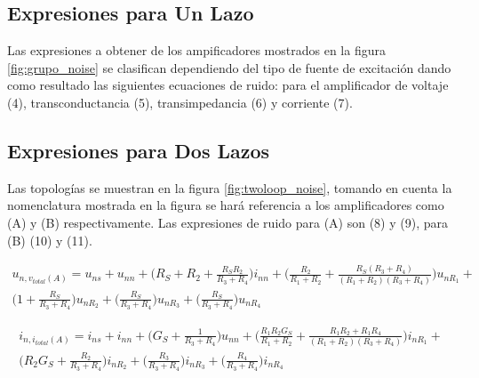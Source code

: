 \documentclass[10pt,twocolumn,twoside,letterpaper]{IEEEtran}
\begin{document}
{\subsection{{\bf Expresiones para Un Lazo}}
\label{sec:exp_1loop} Las expresiones a obtener de los ampificadores mostrados en la figura \ref{fig:grupo_noise} se clasifican dependiendo del tipo de fuente de excitaci\'on dando como resultado las siguientes ecuaciones de ruido: para el amplificador de voltaje (4), transconductancia (5), transimpedancia (6) y corriente (7).

\subsection{{\bf Expresiones para Dos Lazos}}
\label{sec:exp_2loop} Las topolog\'ias se muestran en la figura \ref{fig:twoloop_noise}, tomando en cuenta la nomenclatura mostrada en la figura se har\'a referencia a los amplificadores como (A) y (B) respectivamente. Las expresiones de ruido para (A) son (8) y (9), para (B) (10) y (11).

\begin{figure*}[!t]
\hrulefill
\begin{footnotesize}\begin{equation}
\label{Amplificador (A) excitado por Voltaje}
\begin{split}
u_{n,v_{total}(A)}=u_{ns}+u_{nn}+\biggl(R_S+R_2+\frac{R_SR_2}{R_3+R_4}\biggr)i_{nn}+\biggl(\frac{R_2}{R_1+R_2}+\frac{R_S(R_3+R_4)}{(R_1+R_2)(R_3+R_4)}\biggr)u_{nR_1}+\\
\biggl(1+\frac{R_S}{R_3+R_4}\biggr)u_{nR_2}+\biggl(\frac{R_S}{R_3+R_4}\biggr)u_{nR_3}+\biggl(\frac{R_S}{R_3+R_4}\biggr)u_{nR_4}
\end{split}
\end{equation}\end{footnotesize}
\begin{footnotesize}\begin{equation}
\begin{split}
i_{n,i_{total}(A)}=i_{ns}+i_{nn}+\biggl(G_S+\frac{1}{R_3+R_4}\biggr)u_{nn}+\biggl(\frac{R_1R_2G_S}{R_1+R_2}+\frac{R_1R_2+R_1R_4}{(R_1+R_2)(R_3+R_4)}\biggr)i_{nR_1}+\\
\biggl(R_2G_S+\frac{R_2}{R_3+R_4}\biggr)i_{nR_2}+\biggl(\frac{R_3}{R_3+R_4}\biggr)i_{nR_3}+\biggl(\frac{R_4}{R_3+R_4}\biggr)i_{nR_4}
\end{split}
\end{equation}\end{footnotesize}


\end{figure*}}
\end{document}
